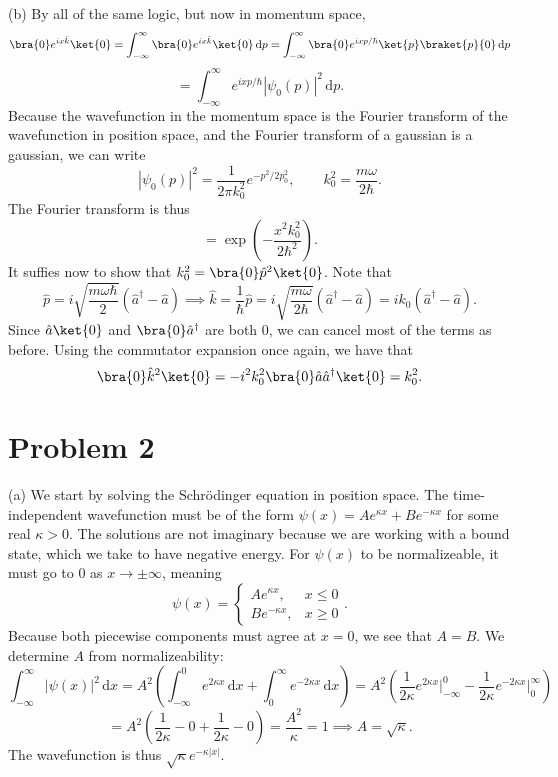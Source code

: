 \documentclass[11pt, letterpaper]{article}
\begin{document}
(b) By all of the same logic, but now in momentum space,
\[
	\bra{0}e^{ix \hat{k} } \ket{0} = \int_{-\infty }^{\infty } \bra{0}e^{ix \hat{k} } \ket{0} \,\mathrm{d} p = \int_{-\infty }^{\infty } \bra{0} e^{ixp/\hbar} \ket{p}\braket{p}{0} \,\mathrm{d} p
\]
\[
	=\int_{-\infty }^{\infty } e^{ixp/\hbar} \left| \psi _0(p) \right| ^2 \,\mathrm{d} p
.\]
Because the wavefunction in the momentum space is the Fourier transform of the wavefunction in position space, and the Fourier transform of a gaussian is a gaussian, we can write
\[
	\left| \psi _0(p) \right| ^2=\frac{1}{2\pi k_0^2} e^{-p^2/2p_0^2} ,\qquad k_0^2 = \frac{m\omega }{2\hbar} 
.\]
The Fourier transform is thus
\[
	=\exp \left( -\frac{x^2 k_0^2}{2\hbar^2}  \right) 
.\]
It suffies now to show that $k_0^2=\bra{0}\hat{p} ^2\ket{0}$. Note that
\[
	\hat{p} =i\sqrt{\frac{m\omega \hbar}{2} } \left( \hat{a} ^\dagger -\hat{a} \right) \implies \hat{k} =\frac{1}{\hbar} \hat{p}  = i\sqrt{\frac{m\omega }{2\hbar} } \left( \hat{a} ^\dagger - \hat{a}  \right) =ik_0 \left( \hat{a}^\dagger - \hat{a}   \right) 
.\]
Since $\hat{a} \ket{0}$ and $\bra{0}\hat{a} ^\dagger$ are both 0, we can cancel most of the terms as before. Using the commutator expansion once again, we have that
\[
	\bra{0}\hat{k} ^2\ket{0}=-i^2k_0^2\bra{0}\hat{a} \hat{a} ^\dagger \ket{0} = k_0^2
.\]

\section{Problem 2}

(a) We start by solving the Schr\"odinger equation in position space. The time-independent wavefunction must be of the form $\psi (x)=Ae^{\kappa x} +Be^{-\kappa x} $ for some real $\kappa >0$. The solutions are not imaginary because we are working with a bound state, which we take to have negative energy. For $\psi (x)$ to be normalizeable, it must go to 0 as $x\to \pm \infty $, meaning
\[
	\psi (x) = 
	\begin{cases}
		Ae^{\kappa x} ,&x\leq 0\\
		Be^{-\kappa x} ,&x\geq 0
	\end{cases}
.\]
Because both piecewise components must agree at $x=0$, we see that $A=B$. We determine $A$ from normalizeability:
\[
	\int_{-\infty }^{\infty } \left| \psi (x) \right| ^2 \,\mathrm{d} x = A^2 \left( \int_{-\infty }^{0} e^{2\kappa x}  \,\mathrm{d} x + \int_{0}^{\infty } e^{-2\kappa x}  \,\mathrm{d} x \right) =A^2 \left( \frac{1}{2\kappa } e^{2\kappa x}\bigg|_{-\infty } ^0 - \frac{1}{2\kappa } e^{-2\kappa x} \bigg|_0^{\infty }   \right) 
\]
\[
	=A^2\left( \frac{1}{2\kappa } -0+\frac{1}{2\kappa } -0 \right) =\frac{A^2}{\kappa } =1 \implies A=\sqrt{\kappa } 
.\]
The wavefunction is thus $\sqrt{\kappa } e^{-\kappa |x|} $.
\end{document}
